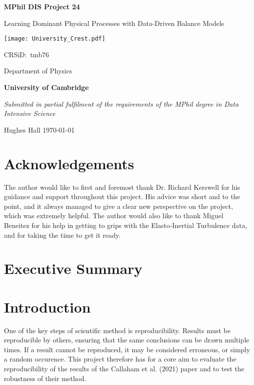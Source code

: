 \documentclass[12pt]{report} %
\begin{document}
\begin{titlepage}
  \centering
  {\LARGE\bfseries MPhil DIS Project 24\par}
  {\LARGE Learning Dominant Physical Processes with Data-Driven Balance Models\par}
  \vspace{1cm}
  {\texttt{[image: University\_Crest.pdf]}\par}
  {\Large CRSiD:\ tmb76\par}
  \vspace{1cm}
  {\Large Department of Physics\par}
  {\Large\bfseries University of Cambridge\par}
  \vfill
  {\itshape Submitted in partial fulfilment of the requirements of the MPhil degree in Data Intensive Science}
  \vfill
  {\large Hughes Hall  \hspace{6cm} \today\par}
\end{titlepage}

\chapter*{Acknowledgements}

The author would like to first and foremost thank Dr. Richard Kerswell for his guidance and support throughout this project. His advice was short and to the point, and it always managed to give a clear new perspective on the project, which was extremely helpful. The author would also like to thank Miguel Beneitez for his help in getting to grips with the Elasto-Inertial Turbulence data, and for taking the time to get it ready.

\tableofcontents

\chapter{Executive Summary}


\chapter{Introduction}


One of the key steps of scientific method is reproducibility. Results must be reproducible by others, ensuring that the same conclusions can be drawn multiple times. If a result cannot be reproduced, it may be considered erroneous, or simply a random occurence. This project therefore has for a core aim to evaluate the reproducibility of the results of the Callaham et al. (2021)\cite{callaham2021learning} paper and to test the robustness of their method.
\end{document}
